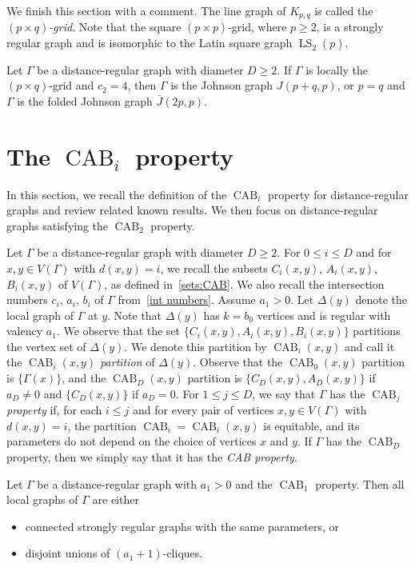 We finish this section with a comment.
The line graph of $K_{p,q}$ is called the \emph{$(p\times q)$-grid}.
Note that the square $(p\times p)$-grid, where $p\geqslant 2$, is a strongly regular graph and is isomorphic to the Latin square graph $\operatorname{LS}_2(p)$.

\begin{lemma}[{cf.~\cite[Proposition 4.1]{JK2003}}]\label{lem:grid}
Let $\Gamma$ be a distance-regular graph with diameter $D\geqslant 2$.
If $\Gamma$ is locally the $(p\times q)$-grid and $c_2=4$, then $\Gamma$ is the Johnson graph $J(p+q,p)$, or $p=q$ and $\Gamma$ is the folded Johnson graph $\bar{J}(2p,p)$.
\end{lemma}

\section{The \texorpdfstring{$\operatorname{CAB}_i$}{CABi} property}\label{Sec:CABprop}
In this section, we recall the definition of the $\operatorname{CAB}_i$ property for distance-regular graphs and review related known results.  
We then focus on distance-regular graphs satisfying the $\operatorname{CAB}_2$ property.

Let $\Gamma$ be a distance-regular graph with diameter $D \geqslant 2$. 
For $0 \leqslant i \leqslant D$ and for $x, y \in V(\Gamma)$ with $d(x, y) = i$, we recall the subsets $C_i(x, y)$, $A_i(x, y)$, $B_i(x, y)$ of $V(\Gamma)$, as defined in~\eqref{sets:CAB}. 
We also recall the intersection numbers $c_i$, $a_i$, $b_i$ of $\Gamma$ from~\eqref{int numbers}.
Assume $a_1 > 0$.
Let $\Delta(y)$ denote the local graph of $\Gamma$ at $y$.
Note that $\Delta(y)$ has $k = b_0$ vertices and is regular with valency $a_1$.
We observe that the set $\{C_i(x,y), A_i(x,y), B_i(x,y)\}$ partitions the vertex set of $\Delta(y)$.
We denote this partition by $\operatorname{CAB}_i(x, y)$ and call it the \emph{$\operatorname{CAB}_i(x, y)$ partition} of $\Delta(y)$. 
Observe that the $\operatorname{CAB}_0(x,y)$ partition is $\{\Gamma(x)\}$, and the $\operatorname{CAB}_D(x,y)$ partition is $\{C_D(x,y), A_D(x,y)\}$ if $a_D\ne 0$ and $\{C_D(x,y)\}$ if $a_D=0$. 
For $1 \leqslant j \leqslant D$, we say that $\Gamma$ has the \emph{$\operatorname{CAB}_j$ property} if, for each $i \leqslant j$ and for every pair of vertices $x, y \in V(\Gamma)$ with $d(x,y)=i$, the partition $\operatorname{CAB}_i=\operatorname{CAB}_i(x,y)$ is equitable, and its parameters do not depend on the choice of vertices $x$ and $y$.
If $\Gamma$ has the $\operatorname{CAB}_D$ property, then we simply say that it has the \emph{CAB property}.
\begin{lemma}[{cf.~\cite[Proposition 2.1]{JK2000-1}}]\label{CAB_1}
Let $\Gamma$ be a distance-regular graph with $a_1 > 0$ and the $\operatorname{CAB}_1$ property. 
Then all local graphs of $\Gamma$ are either
\begin{itemize}
  \item[\rm (i)] connected strongly regular graphs with the same parameters, or
  \item[\rm (ii)] disjoint unions of $(a_1 +1)$-cliques.
\end{itemize}
\end{lemma}


